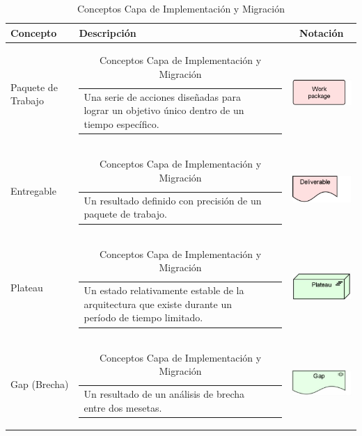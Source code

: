\begin{longtable}[c]{|p{2.5cm}|l|c|}
	\caption{Conceptos Capa de Implementación y Migración}
	\label{my-label}\\
	\hline
	\textbf{Concepto} 			& \textbf{Descripción}                                                                                                                                            & \textbf{Notación} \\ \hline
	\endhead
	Paquete de Trabajo			& \begin{tabular}[c]{p{7cm}@{}l@{}}Una serie de acciones diseñadas para lograr un objetivo único dentro de un tiempo específico.\end{tabular}                                                    & \includegraphics[width=35mm]{arquitectura/adm_lenguaje/imgs/implementacionMigration/WorkPackage}           \\ \hline
	Entregable					& \begin{tabular}[c]{p{7cm}@{}l@{}}Un resultado definido con precisión de un paquete de trabajo.\end{tabular} & \includegraphics[width=35mm]{arquitectura/adm_lenguaje/imgs/implementacionMigration/Deliverable}          \\ \hline
	Plateau						& \begin{tabular}[c]{p{7cm}@{}l@{}}Un estado relativamente estable de la arquitectura que existe durante un período de tiempo limitado.\end{tabular} & \includegraphics[width=35mm]{arquitectura/adm_lenguaje/imgs/implementacionMigration/Plateau}          \\ \hline
	Gap (Brecha)	   			& \begin{tabular}[c]{p{7cm}@{}l@{}}Un resultado de un análisis de brecha entre dos mesetas.\end{tabular} & \includegraphics[width=35mm]{arquitectura/adm_lenguaje/imgs/implementacionMigration/Gap}          \\ \hline
\end{longtable}
